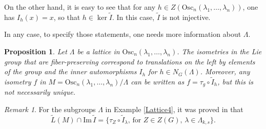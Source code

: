 \documentclass[12pt]{amsart}
\theoremstyle{plain}
\newtheorem{prop}[thm]{Proposition}
\theoremstyle{definition}
\theoremstyle{remark}
\newtheorem{rem}{Remark}
\begin{document}
On the other hand, it is easy to see that for any \( h \in Z(\text{Osc}_n(\lambda_1, \ldots, \lambda_n)) \), one has \( I_h(x) = x \), so that \( h \in \ker \widetilde{I} \). In this case, \( \widetilde{I} \) is not injective.

In any case, to specify those statements, one needs more information about \( \Lambda \).

\begin{prop}
    Let \( \Lambda \) be a lattice in \( \text{Osc}_n(\lambda_1, \ldots, \lambda_n) \). The isometries in the Lie group that are fiber-preserving correspond to translations on the left by elements of the group and the inner automorphisms \( I_h \) for \( h \in N_G(\Lambda) \). Moreover, any isometry \( f \) in \( M = \text{Osc}_n(\lambda_1, \ldots, \lambda_n)/\Lambda \) can be written as \( f = \tau_g \circ \widetilde{I}_h \), but this is not necessarily unique.
\end{prop}

\begin{rem}
    For the subgroups \( \Lambda \) in Example \ref{Lattice4}, it was proved in \cite{BOV} that
    \[
    \tilde{L}(M) \cap \text{Im}\, \tilde{I} = \{\tau_Z \circ \widetilde{I}_{\lambda}, \, \text{for } Z \in Z(G), \, \lambda \in \Lambda_{k,s}\}.
    \]
\end{rem}
\end{document}
